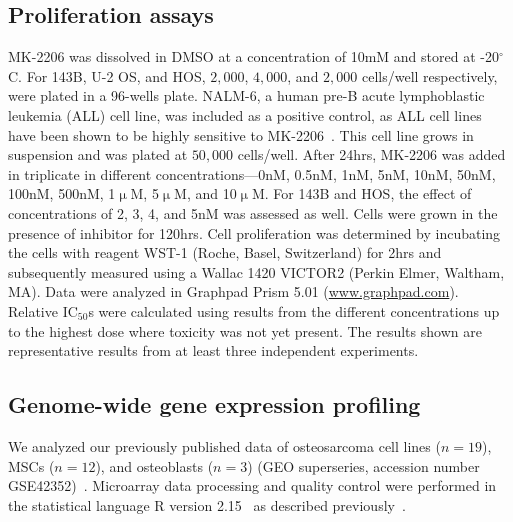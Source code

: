 \subsection{Proliferation assays}
MK-2206 was dissolved in DMSO at a concentration of 10mM and stored at -20$^\circ$C. For 143B, U-2 OS, and HOS, $2,000$, $4,000$, and $2,000$ cells/well respectively, were plated in a 96-wells plate. NALM-6, a human pre-B acute lymphoblastic leukemia (ALL) cell line, was included as a positive control, as ALL cell lines have been shown to be highly sensitive to MK-2206~\cite{gorlick2012testing}. This cell line grows in suspension and was plated at $50,000$ cells/well. After 24hrs, MK-2206 was added in triplicate in different concentrations---0nM, 0.5nM, 1nM, 5nM, 10nM, 50nM, 100nM, 500nM, 1$\upmu$M, 5$\upmu$M, and 10$\upmu$M. For 143B and HOS, the effect of concentrations of 2, 3, 4, and 5nM was assessed as well. Cells were grown in the presence of inhibitor for 120hrs. Cell proliferation was determined by incubating the cells with reagent WST-1 (Roche, Basel, Switzerland) for 2hrs and subsequently measured using a Wallac 1420 VICTOR2 (Perkin Elmer, Waltham, MA). Data were analyzed in Graphpad Prism 5.01 (\url{www.graphpad.com}). Relative IC$_{50}$s were calculated using results from the different concentrations up to the highest dose where toxicity was not yet present. The results shown are representative results from at least three independent experiments.

\subsection{Genome\hyp{}wide gene expression profiling}
We analyzed our previously published data of osteosarcoma cell lines ($n=19$), MSCs ($n=12$), and osteoblasts ($n=3$) (GEO superseries, accession number GSE42352)~\cite{kuijjer2012identification}. Microarray data processing and quality control were performed in the statistical language R version 2.15~\cite{r2.15.0} as described previously~\cite{buddingh2011tumor}.

